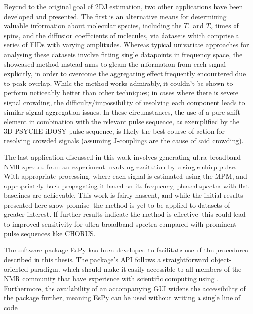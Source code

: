 Beyond to the original goal of \ac{2DJ} estimation, two other applications
have been developed and presented. The first is an alternative means for
determining valuable information about molecular species, including the $T_1$
and $T_2$ times of spins, and the diffusion coefficients of molecules, via
datasets which comprise a series of \acp{FID} with varying amplitudes. Whereas
typical univariate
approaches for analysing these datasets involve fitting single datapoints in
frequency space, the showcased method instead aims to gleam the
information from each signal explicitly, in order to overcome the aggregating
effect frequently encountered due to peak overlap. While the method works
admirably,
it couldn't be shown to perform noticeably better than other techniques; in
cases where there is severe signal crowding, the difficulty/impossibility of
resolving each component leads to similar signal aggregation issues.
In these circumstances, the use of a pure shift element in
combination with the relevant pulse sequence, as exemplified by the
\ac{3D} \ac{PSYCHE}-i\ac{DOSY} pulse sequence\cite{Foroozandeh2016}, is likely
the best course of action for resolving crowded signals (assuming J-couplings
are the cause of said crowding).

The last application discussed in this work involves generating ultra-broadband
\ac{NMR} spectra from an experiment involving excitation by a single chirp
pulse. With appropriate processing, where each signal is estimated using the
\ac{MPM}, and appropriately back-propagating it based on its frequency, phased
spectra with flat baselines are achievable.
This work is fairly nascent, and while the initial results presented here show
promise, the method is yet to be applied to datasets of greater interest. If
further results indicate the method is effective, this could lead to improved
sensitivity for ultra-broadband spectra compared with prominent pulse sequences
like \ac{CHORUS}.

The software package \ac{EsPy} has been developed to facilitate use of the
procedures described in this thesis. The package's \ac{API} follows a
straightforward object-oriented paradigm, which should make it easily
accessible to all members of the \ac{NMR} community that have experience with
scientific computing using \Python\!. Furthermore, the availability of an
accompanying \ac{GUI} widens the accessibility of the package further, meaning
\ac{EsPy} can be used without writing a single line of code.

